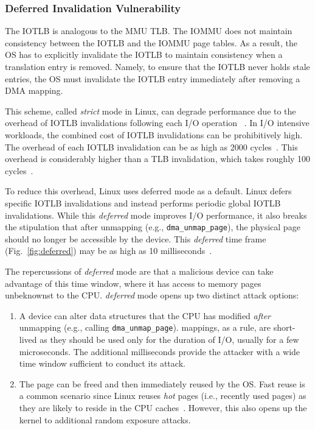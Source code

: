 \subsubsection{Deferred Invalidation Vulnerability}\label{sec:deferred}
The IOTLB is analogous to the MMU TLB. The IOMMU does not maintain consistency between the IOTLB and the IOMMU page tables. As a result, the OS has to explicitly invalidate the IOTLB to maintain consistency when a translation entry is removed. Namely, to ensure that the IOTLB never holds stale entries, the OS must invalidate the IOTLB entry immediately after removing a DMA mapping. 

This scheme, called \emph{strict} mode in Linux, can degrade performance due to the overhead of IOTLB invalidations following each I/O operation ~\cite{MMT16,MSMT18,Peleg15}. In I/O intensive workloads, the combined cost of IOTLB invalidations can be prohibitively high. The overhead of each IOTLB invalidation can be as high as 2000 cycles~\cite{ABYTS11}. This overhead is considerably higher than a TLB invalidation, which takes roughly 100 cycles~\cite{Han14}. 

To reduce this overhead, Linux uses deferred mode as a default. Linux defers specific IOTLB invalidations and instead performs periodic global IOTLB invalidations. While this \emph{deferred} mode improves I/O performance, it also breaks the stipulation that after unmapping (e.g., \texttt{dma\_unmap\_page}), the physical page should no longer be accessible by the device. This \emph{deferred} time frame (Fig.~\ref{fig:deferred}) may be as high as 10 milliseconds~\cite{MSMT18}.

The repercussions of \emph{deferred} mode are that a malicious device can take advantage of this time window, where it has access to memory pages unbeknownst to the CPU. \emph{deferred} mode opens up two distinct attack options:

\begin{enumerate}[labelindent=0pt]
    \item A device can alter data structures that the CPU has modified \emph{after} unmapping (e.g., calling \texttt{dma\_unmap\_page}).
    \iova{} mappings, as a rule, are short-lived as they should be used only for the duration of I/O, usually for a few microseconds. The additional milliseconds provide the attacker with a wide time window sufficient to conduct its attack.
    \item The page can be freed and then immediately reused by the OS. Fast reuse is a common scenario since Linux reuses \emph{hot} pages (i.e., recently used pages) as they are likely to reside in the CPU caches~\cite{hotcold}. However, this also opens up the kernel to additional random exposure attacks.
\end{enumerate}



